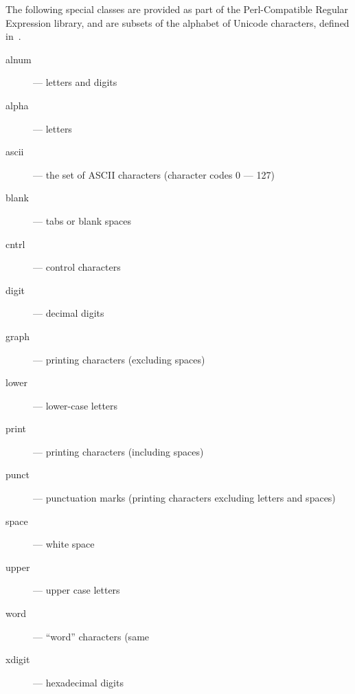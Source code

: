 The following special classes are provided as part of the Perl-Compatible
Regular Expression library, and are subsets of the alphabet of Unicode
characters, defined in~\cite{php_group_gutmans_lerdorf_suraski_boerger}.
\begin{multicols}{2}
\begin{description}

\item[alnum] --- letters and digits

\item[alpha] --- letters

\item[ascii] --- the set of ASCII characters (character codes 0 --- 127)

\item[blank] --- tabs or blank spaces

\item[cntrl] --- control characters

\item[digit] --- decimal digits

\item[graph] --- printing characters (excluding spaces)

\item[lower] --- lower-case letters

\item[print] --- printing characters (including spaces)

\item[punct] --- punctuation marks (printing characters excluding letters and spaces)

\item[space] --- white space

\item[upper] --- upper case letters

\item[word] --- ``word'' characters (same

\item[xdigit] --- hexadecimal digits

\end{description}
\end{multicols}
